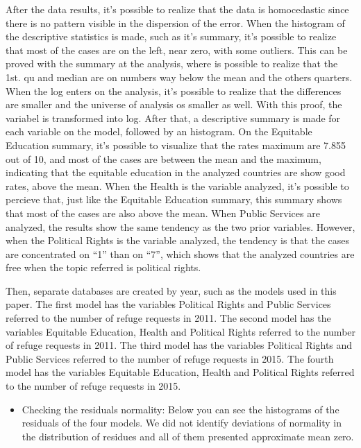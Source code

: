 \documentclass[]{elsarticle} %
\providecommand{\tightlist}{%
  \setlength{\itemsep}{0pt}\setlength{\parskip}{0pt}}
\begin{document}
After the data results, it's possible to realize that the data is
homocedastic since there is no pattern visible in the dispersion of the
error. When the histogram of the descriptive statistics is made, such as
it's summary, it's possible to realize that most of the cases are on the
left, near zero, with some outliers. This can be proved with the summary
at the analysis, where is possible to realize that the 1st. qu and
median are on numbers way below the mean and the others quarters. When
the log enters on the analysis, it's possible to realize that the
differences are smaller and the universe of analysis os smaller as well.
With this proof, the variabel is transformed into log. After that, a
descriptive summary is made for each variable on the model, followed by
an histogram. On the Equitable Education summary, it's possible to
visualize that the rates maximum are 7.855 out of 10, and most of the
cases are between the mean and the maximum, indicating that the
equitable education in the analyzed countries are show good rates, above
the mean. When the Health is the variable analyzed, it's possible to
percieve that, just like the Equitable Education summary, this summary
shows that most of the cases are also above the mean. When Public
Services are analyzed, the results show the same tendency as the two
prior variables. However, when the Political Rights is the variable
analyzed, the tendency is that the cases are concentrated on ``1'' than
on ``7'', which shows that the analyzed countries are free when the
topic referred is political rights.

Then, separate databases are created by year, such as the models used in
this paper. The first model has the variables Political Rights and
Public Services referred to the number of refuge requests in 2011. The
second model has the variables Equitable Education, Health and Political
Rights referred to the number of refuge requests in 2011. The third
model has the variables Political Rights and Public Services referred to
the number of refuge requests in 2015. The fourth model has the
variables Equitable Education, Health and Political Rights referred to
the number of refuge requests in 2015.

\begin{itemize}
\tightlist
\item
  Checking the residuals normality: Below you can see the histograms of
  the residuals of the four models. We did not identify deviations of
  normality in the distribution of residues and all of them presented
  approximate mean zero.
\end{itemize}
\end{document}
